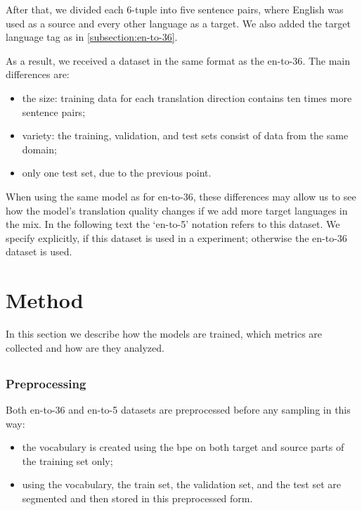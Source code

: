 After that, we divided each 6-tuple into five sentence pairs,
where English was used as a source and every other language as a target.
We also added the target language tag as in \cref{subsection:en-to-36}.

As a result, we received a dataset in the same format as the \gls{en-to-36}.
The main differences are:
\begin{itemize}
	\item the size: training data for each translation direction
		contains ten times more sentence pairs;
	\item variety: the training, validation, and test sets
		consist of data from the same domain;
	\item only one test set, due to the previous point.
\end{itemize}
When using the same model as for \gls{en-to-36}, these differences may
allow us to see how the model's translation quality changes if we add
more target languages in the mix.
In the following text the `en-to-5' notation refers to this dataset.
We specify explicitly, if this dataset is used in a experiment;
otherwise the en-to-36 dataset is used.


\section{Method}
\label{section:method}

In this section we describe how the models are trained, which metrics
are collected and how are they analyzed.


\subsection{}
\label{section:training_tasks}



\subsection{}
\label{section:data_selection}
\label{section:data_preprocessing}

\subsubsection*{Preprocessing}
	Both en-to-36 and en-to-5 datasets
are preprocessed before any sampling in this way:
\begin{itemize}
	\item the vocabulary is created using the \acrshort{bpe}
		on both target and source parts of the training set only;
	\item using the vocabulary, the train set, the validation
		set, and the test set are segmented and then stored
		in this preprocessed form.
\end{itemize}

